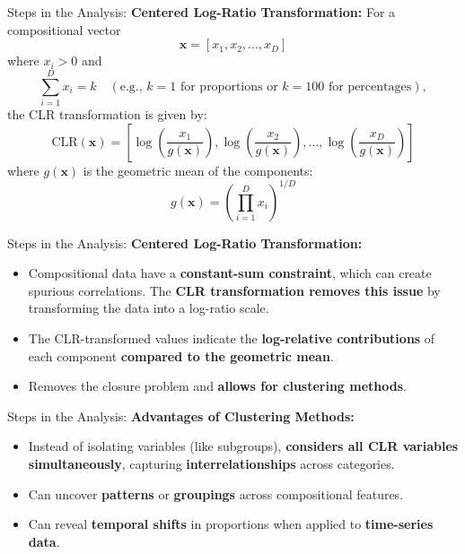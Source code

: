 \documentclass[
	11pt, %
]{beamer}
\begin{document}
\begin{frame}{Steps in the Analysis:}
    \textbf{Centered Log-Ratio Transformation:}
For a compositional vector 
\[
\mathbf{x} = [x_1, x_2, \dots, x_D]
\]
where \( x_i > 0 \) and 
\[
\sum_{i=1}^{D} x_i = k \quad (\text{e.g., } k = 1 \text{ for proportions or } k = 100 \text{ for percentages}),
\]
the CLR transformation is given by:
\[
\text{CLR}(\mathbf{x}) = \left[ \log \left( \frac{x_1}{g(\mathbf{x})} \right), \log \left( \frac{x_2}{g(\mathbf{x})} \right), \dots, \log \left( \frac{x_D}{g(\mathbf{x})} \right) \right]
\]
where \( g(\mathbf{x}) \) is the geometric mean of the components:
\[
g(\mathbf{x}) = \left( \prod_{i=1}^{D} x_i \right)^{1/D}
\]

\end{frame}

\begin{frame}{Steps in the Analysis:}
    \textbf{Centered Log-Ratio Transformation:}

    \begin{itemize}
        \item Compositional data have a \textbf{constant-sum constraint}, which can create spurious correlations. The \textbf{CLR transformation removes this issue} by transforming the data into a log-ratio scale.
        \item The CLR-transformed values indicate the \textbf{log-relative contributions} of each component \textbf{compared to the geometric mean}.
        \item Removes the closure problem and \textbf{allows for clustering methods}. 
    \end{itemize}

\end{frame}

\begin{frame}{Steps in the Analysis:}
    \textbf{Advantages of Clustering Methods:}

    \begin{itemize}
        \item Instead of isolating variables (like subgroups), \textbf{considers all CLR variables simultaneously}, capturing \textbf{interrelationships} across categories.
        \item Can uncover \textbf{patterns} or \textbf{groupings} across compositional features.
        \item Can reveal \textbf{temporal shifts} in proportions when applied to \textbf{time-series data}.

    \end{itemize}

\end{frame}
\end{document}
